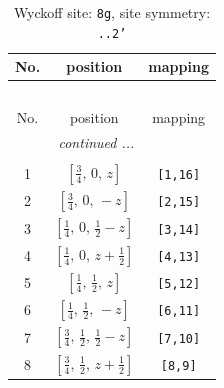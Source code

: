 \documentclass[fleqn,8pt]{jsarticle}
\begin{document}
\begin{longtable}{ccc}
\caption{Wyckoff site: {\tt 8g}, site symmetry: {\tt ..2'}}
 \\
 \hline \hline
No. & position & mapping \\ \hline \endfirsthead

\multicolumn{2}{l}{\tablename\ \thetable{}} \\
 \hline \hline
No. & position & mapping \\ \hline \endhead

 \hline \hline
\multicolumn{2}{r}{\footnotesize\it continued ...} \\ \endfoot

 \hline \hline
\multicolumn{2}{r}{} \\ \endlastfoot

1 & $\left[ \frac{3}{4},\, 0,\, z \right]$ & {\tt [1,16]} \\ \hline
2 & $\left[ \frac{3}{4},\, 0,\, - z \right]$ & {\tt [2,15]} \\ \hline
3 & $\left[ \frac{1}{4},\, 0,\, \frac{1}{2} - z \right]$ & {\tt [3,14]} \\ \hline
4 & $\left[ \frac{1}{4},\, 0,\, z + \frac{1}{2} \right]$ & {\tt [4,13]} \\ \hline
5 & $\left[ \frac{1}{4},\, \frac{1}{2},\, z \right]$ & {\tt [5,12]} \\ \hline
6 & $\left[ \frac{1}{4},\, \frac{1}{2},\, - z \right]$ & {\tt [6,11]} \\ \hline
7 & $\left[ \frac{3}{4},\, \frac{1}{2},\, \frac{1}{2} - z \right]$ & {\tt [7,10]} \\ \hline
8 & $\left[ \frac{3}{4},\, \frac{1}{2},\, z + \frac{1}{2} \right]$ & {\tt [8,9]} \\
\end{longtable}
\renewcommand{\arraystretch}{1.2}
\end{document}
